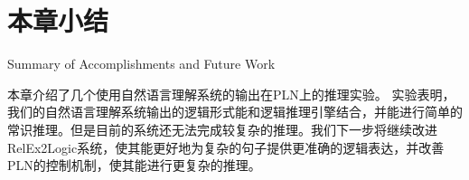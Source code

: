 \section{本章小结}{Summary of Accomplishments and Future Work}

本章介绍了几个使用自然语言理解系统的输出在PLN上的推理实验。 实验表明，我们的自然语言理解系统输出的逻辑形式能和逻辑推理引擎结合，并能进行简单的常识推理。但是目前的系统还无法完成较复杂的推理。我们下一步将继续改进RelEx2Logic系统，使其能更好地为复杂的句子提供更准确的逻辑表达，并改善PLN的控制机制，使其能进行更复杂的推理。
